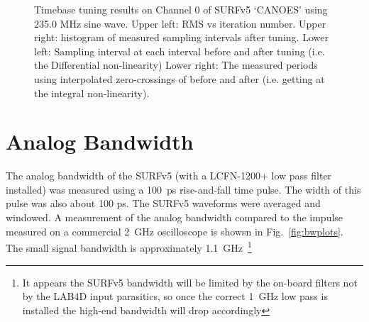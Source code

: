 \documentclass[11pt]{article}
\begin{document}
\begin{figure}[h!]
\begin{center}
    \end{center}
    \caption{Timebase tuning results on Channel 0 of SURFv5 `CANOES' using 235.0 MHz sine wave.  Upper left: RMS vs iteration number.  Upper right: histogram of measured sampling intervals after tuning.  Lower left: Sampling interval at each interval before and after tuning (i.e. the Differential non-linearity) 
    Lower right: The measured periods using interpolated zero-crossings of before and after (i.e. getting at the integral non-linearity). }
    \label{fig:tunetime}
\end{figure}


\section{Analog Bandwidth}

The analog bandwidth of the SURFv5 (with a LCFN-1200+ low pass filter installed)  was measured using a 100~ps rise-and-fall time pulse. The width of this pulse was also about 100 ps.
The SURFv5 waveforms were averaged and windowed. A measurement of the analog bandwidth compared to the impulse measured on a commercial 2~GHz oscilloscope
is showsn in Fig.~\ref{fig:bwplots}. The small signal bandwidth is approximately 1.1~GHz~\footnote{It appears the SURFv5 bandwidth will be limited by the on-board filters not by the LAB4D input parasitics,
  so once the correct 1~GHz low pass is installed the high-end bandwidth will drop accordingly}
\end{document}
